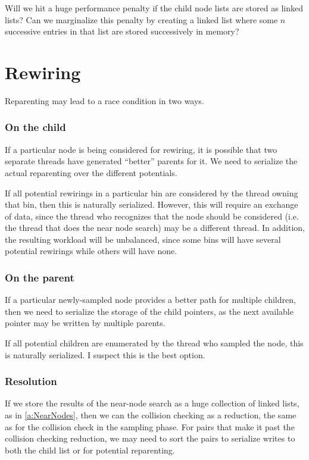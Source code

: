 Will we hit a huge performance penalty if the child node lists are stored as linked lists? Can we marginalize this penalty by creating a linked list where some $n$ successive entries in that list are stored successively in memory?

\begin{figure}[H]
\begin{centering}
    \texttt{[image: \\figfile\{fig/child\_list]}}
    \caption{Linked-list of arrays}
\end{centering} 
\end{figure}


\section{Rewiring}

Reparenting may lead to a race condition in two ways. 

\subsubsection{On the child}
If a particular node is being considered for rewiring, it is possible that two separate threads have generated ``better'' parents for it. We need to serialize the actual reparenting over the different potentials. 

If all potential rewirings in a particular bin are considered by the thread owning that bin, then this is naturally serialized. However, this will require an exchange of data, since the thread who recognizes that the node should be considered (i.e. the thread that does the near node search) may be a different thread. In addition, the resulting workload will be unbalanced, since some bins will have several potential rewirings while others will have none.


\subsubsection{On the parent}
If a particular newly-sampled node provides a better path for multiple children, then we need to serialize the storage of the child pointers, as the next available pointer may be written by multiple parents. 

If all potential children are enumerated by the thread who sampled the node, this is naturally serialized. I suspect this is the best option. 

\subsubsection{Resolution}
If we store the results of the near-node search as a huge collection of linked lists, as in \ref{a:NearNodes}, then we can the collision checking as a reduction, the same as for the collision check in the sampling phase. For pairs that make it past the collision checking reduction, we may need to sort the pairs to serialize writes to both the child list or for potential reparenting. 

